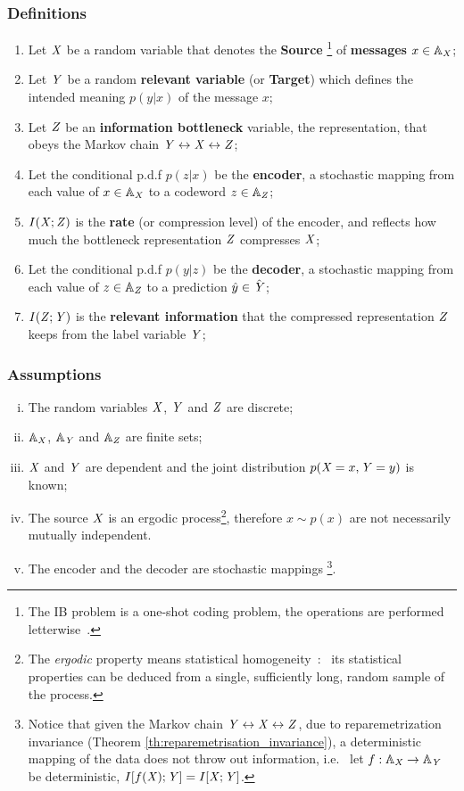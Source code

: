 \subsubsection{Definitions}
\begin{enumerate}
	\item Let ${\mathit{X}}$ be a random variable that denotes the \textbf{Source} \footnote{The IB problem is a one-shot coding problem, the operations are performed letterwise~.} of \textbf{messages} ${x} \in {\mathbb{A}}_{{\mathit{X}}}$;
	\item Let ${\mathit{Y}}$ be a random \textbf{relevant variable}  (or \textbf{Target}) which defines the intended meaning $p(y|x)$ of the message $x$;
	\item Let ${\mathit{Z}}$ be an \textbf{information bottleneck} variable, the representation, that obeys the Markov chain ${\mathit{Y}} \leftrightarrow {\mathit{X}} \leftrightarrow {\mathit{Z}}$;
	\item Let the conditional p.d.f $p(z|x)$ be the \textbf{encoder}, \ie a stochastic mapping from each value of $x \in {\mathbb{A}}_{{\mathit{X}}}$ to a codeword $z \in {\mathbb{A}}_{{\mathit{Z}}}$;
	\item $I({\mathit{X}} ; {\mathit{Z}})$ is the \textbf{rate} (or compression level) of the encoder, and reflects how much the bottleneck representation  ${\mathit{Z}}$ compresses ${\mathit{X}}$;
	\item Let the conditional p.d.f $p(y|z)$ be the \textbf{decoder}, \ie a stochastic mapping from each value of $z \in {\mathbb{A}}_{{\mathit{Z}}}$ to a prediction $\hat{y} \in \hat{{\mathit{Y}}}$;
	\item $I({\mathit{Z}} ; {\mathit{Y}})$ is the \textbf{relevant information} that the compressed representation ${\mathit{Z}}$ keeps from the label variable ${\mathit{Y}}$;
\end{enumerate}

  \subsubsection{Assumptions}\label{assumptions}
  \begin{enumerate}
    [i.]
    \item The random variables ${\mathit{X}}$, ${\mathit{Y}}$ and ${\mathit{Z}}$ are discrete;
    \item ${\mathbb{A}}_{{\mathit{X}}}$, ${\mathbb{A}}_{{\mathit{Y}}}$ and ${\mathbb{A}}_{{\mathit{Z}}}$ are finite sets;
    \item ${\mathit{X}}$ and ${\mathit{Y}}$ are dependent and the joint distribution $p({\mathit{X}}=x, {\mathit{Y}}=y)$ is known;
		\item The source ${\mathit{X}}$ is an ergodic process\footnote{The \emph{ergodic} property means statistical homogeneity~:~ its statistical properties can be deduced from a single, sufficiently long, random sample of the process.}, therefore $x \sim p(x)$ are not necessarily mutually independent.
		\item The encoder and the decoder are stochastic mappings \footnote{Notice that given the Markov chain ${\mathit{Y}} \leftrightarrow {\mathit{X}} \leftrightarrow {\mathit{Z}}$, due to reparemetrization invariance (Theorem \ref{th:reparemetrisation_invariance}), a deterministic mapping of the data does not throw out information, i.e. \ let $f:{\mathbb{A}}_{{\mathit{X}}} \to {\mathbb{A}}_{{\mathit{Y}}}$ be deterministic, $I[f({\mathit{X}});{\mathit{Y}}]=I[{{\mathit{X}}};{{\mathit{Y}}}]$.}.
  \end{enumerate}
